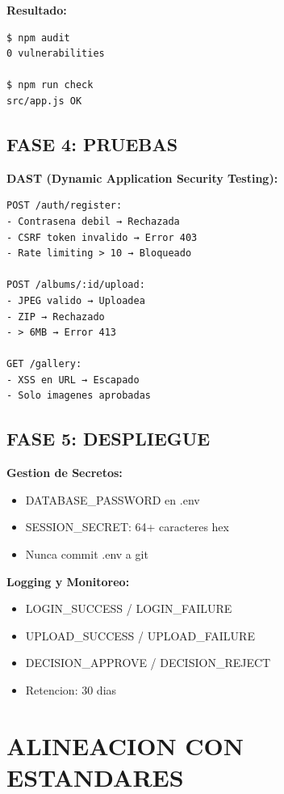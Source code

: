 \documentclass[12pt,a4paper]{article}
\begin{document}
\textbf{Resultado:}

\begin{lstlisting}
$ npm audit
0 vulnerabilities

$ npm run check
src/app.js OK
\end{lstlisting}

\subsection{FASE 4: PRUEBAS}

\textbf{DAST (Dynamic Application Security Testing):}

\begin{lstlisting}
POST /auth/register:
- Contrasena debil → Rechazada
- CSRF token invalido → Error 403
- Rate limiting > 10 → Bloqueado

POST /albums/:id/upload:
- JPEG valido → Uploadea
- ZIP → Rechazado
- > 6MB → Error 413

GET /gallery:
- XSS en URL → Escapado
- Solo imagenes aprobadas
\end{lstlisting}

\subsection{FASE 5: DESPLIEGUE}

\textbf{Gestion de Secretos:}

\begin{itemize}
    \item DATABASE\_PASSWORD en .env
    \item SESSION\_SECRET: 64+ caracteres hex
    \item Nunca commit .env a git
\end{itemize}

\textbf{Logging y Monitoreo:}

\begin{itemize}
    \item LOGIN\_SUCCESS / LOGIN\_FAILURE
    \item UPLOAD\_SUCCESS / UPLOAD\_FAILURE
    \item DECISION\_APPROVE / DECISION\_REJECT
    \item Retencion: 30 dias
\end{itemize}

\section{ALINEACION CON ESTANDARES}
\end{document}
